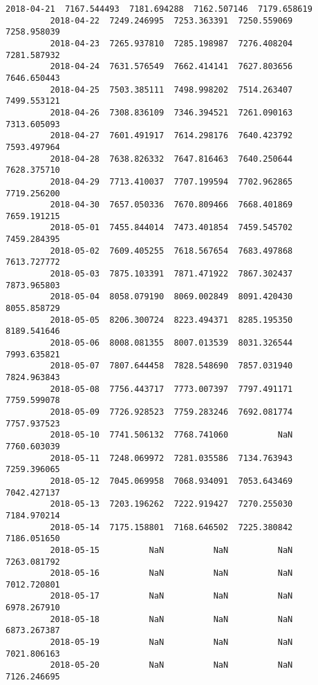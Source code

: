 \documentclass[11pt]{article}
\begin{document}
\begin{Verbatim}[commandchars=\\\{\}]
         2018-04-21  7167.544493  7181.694288  7162.507146  7179.658619   
         2018-04-22  7249.246995  7253.363391  7250.559069  7258.958039   
         2018-04-23  7265.937810  7285.198987  7276.408204  7281.587932   
         2018-04-24  7631.576549  7662.414141  7627.803656  7646.650443   
         2018-04-25  7503.385111  7498.998202  7514.263407  7499.553121   
         2018-04-26  7308.836109  7346.394521  7261.090163  7313.605093   
         2018-04-27  7601.491917  7614.298176  7640.423792  7593.497964   
         2018-04-28  7638.826332  7647.816463  7640.250644  7628.375710   
         2018-04-29  7713.410037  7707.199594  7702.962865  7719.256200   
         2018-04-30  7657.050336  7670.809466  7668.401869  7659.191215   
         2018-05-01  7455.844014  7473.401854  7459.545702  7459.284395   
         2018-05-02  7609.405255  7618.567654  7683.497868  7613.727772   
         2018-05-03  7875.103391  7871.471922  7867.302437  7873.965803   
         2018-05-04  8058.079190  8069.002849  8091.420430  8055.858729   
         2018-05-05  8206.300724  8223.494371  8285.195350  8189.541646   
         2018-05-06  8008.081355  8007.013539  8031.326544  7993.635821   
         2018-05-07  7807.644458  7828.548690  7857.031940  7824.963843   
         2018-05-08  7756.443717  7773.007397  7797.491171  7759.599078   
         2018-05-09  7726.928523  7759.283246  7692.081774  7757.937523   
         2018-05-10  7741.506132  7768.741060          NaN  7760.603039   
         2018-05-11  7248.069972  7281.035586  7134.763943  7259.396065   
         2018-05-12  7045.069958  7068.934091  7053.643469  7042.427137   
         2018-05-13  7203.196262  7222.919427  7270.255030  7184.970214   
         2018-05-14  7175.158801  7168.646502  7225.380842  7186.051650   
         2018-05-15          NaN          NaN          NaN  7263.081792   
         2018-05-16          NaN          NaN          NaN  7012.720801   
         2018-05-17          NaN          NaN          NaN  6978.267910   
         2018-05-18          NaN          NaN          NaN  6873.267387   
         2018-05-19          NaN          NaN          NaN  7021.806163   
         2018-05-20          NaN          NaN          NaN  7126.246695   
         

\end{Verbatim}
\end{document}
